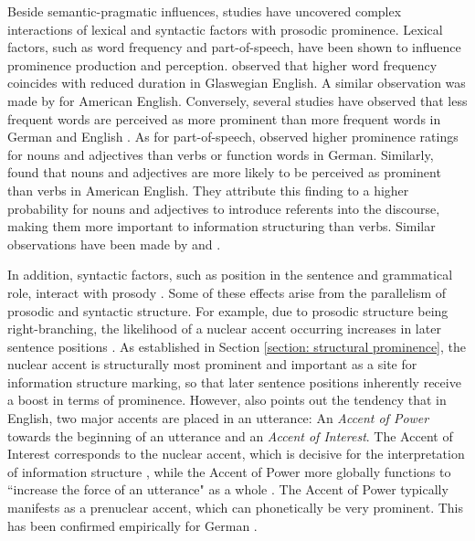 Beside semantic-pragmatic influences, studies have uncovered complex interactions of lexical and syntactic factors with prosodic prominence. Lexical factors, such as word frequency and part-of-speech, have been shown to influence prominence production and perception. \citet{aylettSmoothSignalRedundancy2004} observed that higher word frequency coincides with reduced duration in Glaswegian English. A similar observation was made by \citet{bakerVariabilityWordDuration2009} for American English. Conversely, several studies have observed that less frequent words are perceived as more prominent than more frequent words in German and English \citep[e.g.,][]{baumannImportanceTonalCues2014, coleSignalbasedExpectationbasedFactors2010, royIndividualDifferencesPatterns2017, baumannWhatMakesWord2018, coleSoundStructureMeaning2019}. As for part-of-speech, \citet{baumannImportanceTonalCues2014} observed higher prominence ratings for nouns and adjectives than verbs or function words in German. Similarly, \citet{coleSoundStructureMeaning2019} found that nouns and adjectives are more likely to be perceived as prominent than verbs in American English. They attribute this finding to a higher probability for nouns and adjectives to introduce referents into the discourse, making them more important to information structuring than verbs. Similar observations have been made by \citet{baumannWhatMakesWord2018} and \citet{royIndividualDifferencesPatterns2017}.

In addition, syntactic factors, such as position in the sentence and grammatical role, interact with prosody \citep{terkenDeaccentuationWordsRepresenting1994}. Some of these effects arise from the parallelism of prosodic and syntactic structure. For example, due to prosodic structure being right-branching, the likelihood of a nuclear accent occurring increases in later sentence positions \citep{calhounHowDoesInformativeness2010}. As established in Section \ref{section: structural prominence}, the nuclear accent is structurally most prominent and important as a site for information structure marking, so that later sentence positions inherently receive a boost in terms of prominence. However, \citet{bolingerIntonationItsParts1986} also points out the tendency that in English, two major accents are placed in an utterance: An \textit{Accent of Power} towards the beginning of an utterance and an \textit{Accent of Interest}. The Accent of Interest corresponds to the nuclear accent, which is decisive for the interpretation of information structure \citep[e.g.,][]{laddIntonationalPhonology2008}, while the Accent of Power more globally functions to ``increase the force of an utterance" as a whole \citep[333]{bolingerIntonationItsParts1986}. The Accent of Power typically manifests as a prenuclear accent, which can phonetically be very prominent. This has been confirmed empirically for German \citep{baumannInfluenceInformativenessProsody2021}.

